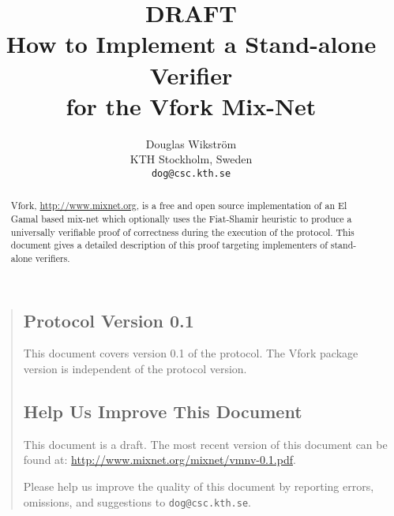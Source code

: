 \documentclass[11pt]{article}
\title{{\Huge DRAFT}\\$\quad$\\How to Implement a Stand-alone Verifier \\for the Vfork Mix-Net}
\author{Douglas Wikstr{\"o}m\\
KTH Stockholm, Sweden\\
\texttt{dog@csc.kth.se}}
\begin{document}


\maketitle

\thispagestyle{empty}

\begin{abstract}

  Vfork, \url{http://www.mixnet.org}, is a free and open
  source implementation of an El Gamal based mix-net which optionally
  uses the Fiat-Shamir heuristic to produce a universally verifiable
  proof of correctness during the execution of the protocol. This
  document gives a detailed description of this proof targeting
  implementers of stand-alone verifiers.

\end{abstract}

\begin{quote}

\subsection*{Protocol Version 0.1}

This document covers version 0.1 of the protocol. The Vfork
package version is independent of the protocol version.


\vfill

\subsection*{Help Us Improve This Document}

This document is a draft. The most recent version of this
document can be found at:
\url{http://www.mixnet.org/mixnet/vmnv-0.1.pdf}.

Please help us improve the quality of this document by reporting
errors, omissions, and suggestions to
\texttt{dog@csc.kth.se}.


\end{quote}

\newpage

\begin{spacing}{0.9}

  \tableofcontents

\end{spacing}

\clearpage

\pagestyle{plain}
\setcounter{page}{1}
\end{document}
